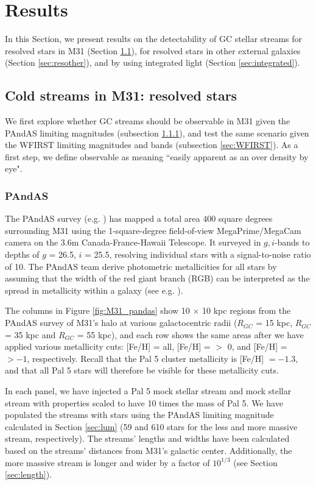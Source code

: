 \documentclass[twocolumn]{aastex62}
\begin{document}
\section{Results}\label{sec:results}
In this Section, we present results on the detectability of GC stellar streams for resolved stars in M31 (Section \ref{sec:resolved}), for resolved stars in other external galaxies (Section \ref{sec:resother}), and by using integrated light (Section \ref{sec:integrated}). 
 

\subsection{Cold streams in M31: resolved stars}
\label{sec:resolved}
We first explore whether GC streams should be observable in M31 given the PAndAS limiting magnitudes (subsection \ref{sec:PANDAS}), and test the same scenario given the WFIRST limiting magnitudes and bands (subsection \ref{sec:WFIRST}). As a first step, we define observable as meaning ``easily apparent as an over density by eye".%


\subsubsection{PAndAS}
\label{sec:PANDAS}
The PAndAS survey (e.g. \citealt{mcconnachie09}) has mapped a total area 400 square degrees surrounding M31 using the 1-square-degree field-of-view MegaPrime/MegaCam camera on the 3.6m Canada-France-Hawaii Telescope. It surveyed in $g, i$-bands to depths of $g$ = 26.5, $i$ = 25.5, resolving individual stars with a signal-to-noise ratio of 10. The PAndAS team derive photometric metallicities for all stars by assuming that the width of the red giant branch (RGB) can be interpreted as the spread in metallicity within a galaxy (see e.g. \citealt{crno14}).

The columns in Figure \ref{fig:M31_pandas} show 10 $\times$ 10 kpc regions from the PAndAS survey of M31's halo at various galactocentric radii ($R_{GC}$ = 15  kpc, $R_{GC}$ = 35 kpc and $R_{GC}$ = 55 kpc), and each row shows the same areas after we have applied various metallicity cuts: [Fe/H] = all,  [Fe/H] = $>$ 0, and  [Fe/H] = $> -1 $, respectively. Recall that the Pal 5 cluster metallicity is  [Fe/H] $= -1.3$, and that all Pal 5 stars will therefore be visible for these metallicity cuts. 

In each panel, we have injected a Pal 5 mock stellar stream and mock stellar stream with properties scaled to have 10 times the mass of Pal 5. We have populated the streams with stars using the PAndAS limiting magnitude calculated in Section \ref{sec:lum} (59 and 610 stars for the less and more massive stream, respectively).  The streams' lengths and widths have been calculated based on the streams' distances from M31's galactic center. Additionally, the more massive stream is longer and wider by a factor of $10^{1/3}$ (see Section \ref{sec:length}). 
\end{document}
